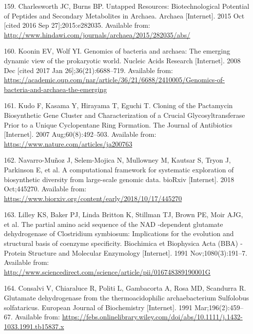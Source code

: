 \documentclass[12pt,twoside]{reedthesis}
\begin{document}
{  \hypertarget{ref-charlesworth_untapped_natural_products_Archaea_2015}{}
  159. Charlesworth JC, Burns BP. Untapped Resources: Biotechnological
  Potential of Peptides and Secondary Metabolites in Archaea. Archaea
  {[}Internet{]}. 2015 Oct {[}cited 2016 Sep 27{]};2015:e282035. Available
  from: \url{http://www.hindawi.com/journals/archaea/2015/282035/abs/}
  
  \hypertarget{ref-koonin_genomics_2008}{}
  160. Koonin EV, Wolf YI. Genomics of bacteria and archaea: The emerging
  dynamic view of the prokaryotic world. Nucleic Acids Research
  {[}Internet{]}. 2008 Dec {[}cited 2017 Jan 26{]};36(21):6688--719.
  Available from:
  \url{https://academic.oup.com/nar/article/36/21/6688/2410005/Genomics-of-bacteria-and-archaea-the-emerging}
  
  \hypertarget{ref-kudo_cloning_2007}{}
  161. Kudo F, Kasama Y, Hirayama T, Eguchi T. Cloning of the Pactamycin
  Biosynthetic Gene Cluster and Characterization of a Crucial
  Glycosyltransferase Prior to a Unique Cyclopentane Ring Formation. The
  Journal of Antibiotics {[}Internet{]}. 2007 Aug;60(8):492--503.
  Available from: \url{https://www.nature.com/articles/ja200763}
  
  \hypertarget{ref-navarro-munoz_computational_2018}{}
  162. Navarro-Muñoz J, Selem-Mojica N, Mullowney M, Kautsar S, Tryon J,
  Parkinson E, et al. A computational framework for systematic exploration
  of biosynthetic diversity from large-scale genomic data. bioRxiv
  {[}Internet{]}. 2018 Oct;445270. Available from:
  \url{https://www.biorxiv.org/content/early/2018/10/17/445270}
  
  \hypertarget{ref-lilley_partial_1991}{}
  163. Lilley KS, Baker PJ, Linda Britton K, Stillman TJ, Brown PE, Moir
  AJG, et al. The partial amino acid sequence of the NAD -dependent
  glutamate dehydrogenase of Clostridium symbiosum: Implications for the
  evolution and structural basis of coenzyme specificity. Biochimica et
  Biophysica Acta (BBA) - Protein Structure and Molecular Enzymology
  {[}Internet{]}. 1991 Nov;1080(3):191--7. Available from:
  \url{http://www.sciencedirect.com/science/article/pii/016748389190001G}
  
  \hypertarget{ref-consalvi_glutamate_1991}{}
  164. Consalvi V, Chiaraluce R, Politi L, Gambacorta A, Rosa MD,
  Scandurra R. Glutamate dehydrogenase from the thermoacidophilic
  archaebacterium Sulfolobus solfataricus. European Journal of
  Biochemistry {[}Internet{]}. 1991 Mar;196(2):459--67. Available from:
  \url{https://febs.onlinelibrary.wiley.com/doi/abs/10.1111/j.1432-1033.1991.tb15837.x}
  
}
\end{document}
